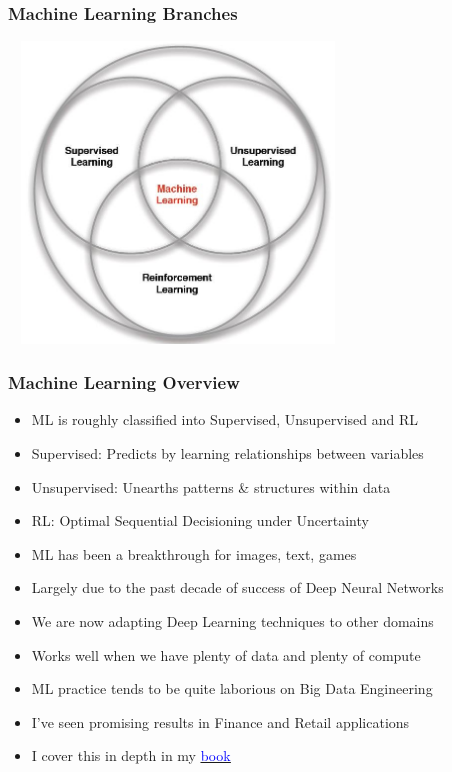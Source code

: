 \documentclass[handout]{beamer}
\begin{document}
\begin{frame}
\frametitle{Machine Learning Branches}
\includegraphics[width=9cm, height=8cm]{../finance/cme241/MLBranches.PNG}
\end{frame}

\begin{frame}
\frametitle{Machine Learning Overview}
\pause
\begin{itemize}[<+->]
\item ML is roughly classified into Supervised, Unsupervised and RL
\item Supervised: Predicts by learning relationships between variables
\item Unsupervised: Unearths patterns \& structures within data
\item RL: Optimal Sequential Decisioning under Uncertainty
\item ML has been a breakthrough for images, text, games
\item Largely due to the past decade of success of Deep Neural Networks
\item We are now adapting Deep Learning techniques to other domains
\item Works well when we have plenty of data and plenty of compute
\item ML practice tends to be quite laborious on Big Data Engineering
\item I've seen promising results in Finance and Retail applications
\item I cover this in depth in my \href{https://www.amazon.com/Foundations-Reinforcement-Learning-Applications-Finance/dp/1032124121}{\underline{\textcolor{blue}{book}}}
\end{itemize}
\end{frame}
\end{document}
